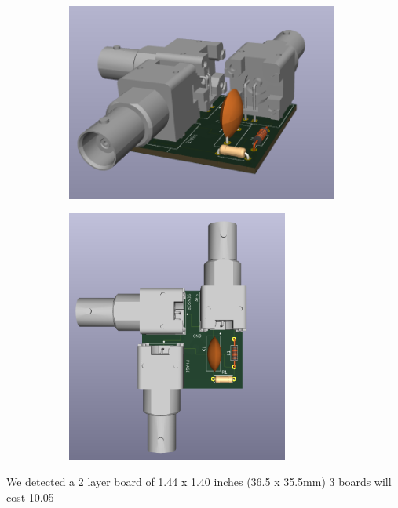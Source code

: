




\begin{figure}[!ht]
	\begin{minipage}[c]{0.5\textwidth}
		\begin{subfigure}{\textwidth}
			\centering
			\includegraphics[width=0.98\textwidth]{Figures/02_06_2025/PCB_3D_perfil_BNC}
			\captionsetup{width=0.8\textwidth}
			\subcaption{}
		\end{subfigure}
	\end{minipage}\begin{minipage}[c]{0.49\textwidth}
		\begin{subfigure}{\textwidth}
			\centering
			\includegraphics[width=0.8\textwidth,angle=90,origin=c]{Figures/02_06_2025/PCB_3D_top_BNC}
			\captionsetup{width=0.8\textwidth}
			\subcaption{}
		\end{subfigure}
	\end{minipage}
	\caption{}
	\label{fig:}
\end{figure}



We detected a 2 layer board of 1.44 x 1.40 inches (36.5 x 35.5mm)
3 boards will cost 10.05 %



